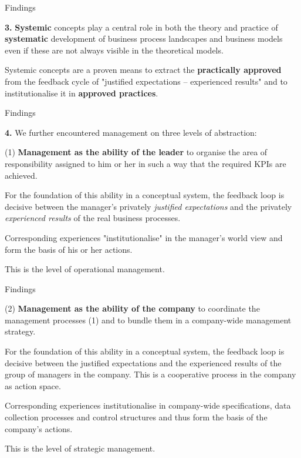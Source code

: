 \documentclass{beamer}
\begin{document}
\begin{frame}{Findings}

\textbf{3.}  \textbf{Systemic} concepts play a central role in both the theory
and practice of \textbf{systematic} development of business process landscapes
and business models even if these are not always visible in the theoretical
models.

Systemic concepts are a proven means to extract the \textbf{practically
  approved} from the feedback cycle of "justified expectations -- experienced
results" and to institutionalise it in \textbf{approved practices}.
\end{frame}

\begin{frame}{Findings}

\textbf{4.}  We further encountered management on three levels of abstraction:

(1) \textbf{Management as the ability of the leader} to organise the area of
responsibility assigned to him or her in such a way that the required KPIs are
achieved.

For the foundation of this ability in a conceptual system, the feedback loop
is decisive between the manager's privately \emph{justified expectations} and
the privately \emph{experienced results} of the real business processes.

Corresponding experiences "institutionalise" in the manager's world view and
form the basis of his or her actions.

This is the level of operational management.

\end{frame}
\begin{frame}{Findings}

(2) \textbf{Management as the ability of the company} to coordinate the
management processes (1) and to bundle them in a company-wide management
strategy.

For the foundation of this ability in a conceptual system, the feedback loop
is decisive between the justified expectations and the experienced results of
the group of managers in the company.  This is a cooperative process in the
company as action space.

Corresponding experiences institutionalise in company-wide specifications,
data collection processes and control structures and thus form the basis of
the company's actions.

This is the level of strategic management.

\end{frame}
\end{document}
